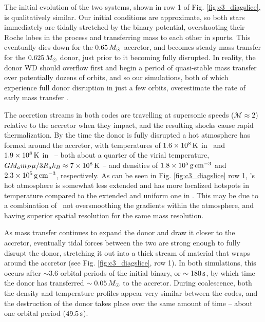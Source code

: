 The initial evolution of the two systems, shown in row 1 of Fig. \ref{fig:c3_diagslice}, is qualitatively similar.  Our initial conditions are approximate, so both stars immediately are tidally stretched by the binary potential, overshooting their Roche lobes in the process and transferring mass to each other in spurts.  This eventually dies down for the $0.65\,\Msun$ accretor, and becomes steady mass transfer for the $0.625\,\Msun$ donor, just prior to it becoming fully disrupted.  In reality, the donor WD should overflow first and begin a period of quasi-stable mass transfer over potentially dozens of orbits, and so our simulations, both of which experience full donor disruption in just a few orbits, overestimate the rate of early mass transfer \citep{dan+11}.


The accretion streams in both codes are travelling at supersonic speeds ($\mathcal{M} \approx 2$) relative to the accretor when they impact, and the resulting shocks cause rapid thermalization.  By the time the donor is fully disrupted a hot atmosphere has formed around the accretor, with temperatures of $1.6 \times 10^8\,\mathrm{K}$ in  \arepo\ and $1.9\times 10^8\,\mathrm{K}$ in \gasoline\ -- both about a quarter of the virial temperature, $GM_am_P\mu/3R_ak_B \approx 7 \times 10^8\,\mathrm{K}$ -- and densities of $1.8\times10^5\,\gcc$ and $2.3\times10^5\,\gcc$, respectively.  As can be seen in Fig. \ref{fig:c3_diagslice} row 1, \arepo's hot atmosphere is somewhat less extended and has more localized hotspots in temperature compared to the extended and uniform one in \gasoline.  This may be due to a combination of \arepo\ not oversmoothing the gradients within the atmosphere, and having superior spatial resolution for the same mass resolution.


As mass transfer continues to expand the donor and draw it closer to the accretor, eventually tidal forces between the two are strong enough to fully disrupt the donor, stretching it out into a thick stream of material that wraps around the accretor (see Fig. \ref{fig:c3_diagslice}, row 1).  In both simulations, this occurs after $\sim3.6$ orbital periods of the initial binary, or $\sim180\,\mathrm{s}$, by which time the donor has transferred $\sim0.05\,\Msun$ to the accretor.  During coalescence, both the density and temperature profiles appear very similar between the codes, and the destruction of the donor takes place over the same amount of time -- about one orbital period ($49.5\,\mathrm{s}$).


